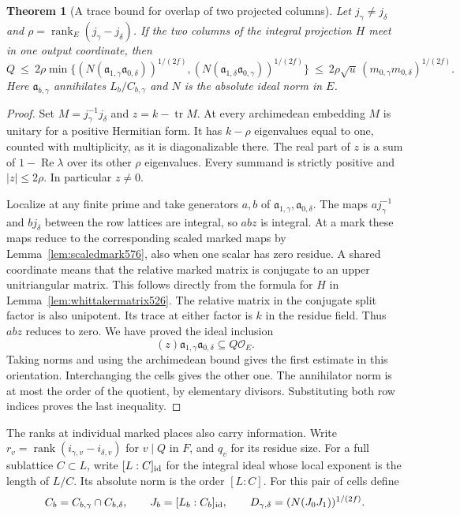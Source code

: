 \documentclass[a4paper,11pt]{article}
\newtheorem{theorem}[proposition]{Theorem}
\theoremstyle{definition}
\theoremstyle{remark}
\numberwithin{equation}{section}
\begin{document}
\begin{theorem}[A trace bound for overlap of two projected columns]
\leavevmode\label{thm:traceoverlap602}
Let \(j_\gamma\ne j_\delta\) and
\(\rho=\operatorname{rank}_E(j_\gamma-j_\delta)\).
If the two columns of the integral projection \(H\) meet in
one output coordinate, then
\[
 Q\ \le\ 2\rho\min\bigl\{
    (N(\mathfrak a_{1,\gamma}\mathfrak a_{0,\delta}))^{1/(2f)},
    (N(\mathfrak a_{1,\delta}\mathfrak a_{0,\gamma}))^{1/(2f)}
                         \bigr\}
 \ \le\ 2\rho\sqrt u\,(m_{0,\gamma}m_{0,\delta})^{1/(2f)} .
\]
Here \(\mathfrak a_{b,\gamma}\) annihilates \(L_b/C_{b,\gamma}\)
and \(N\) is the absolute ideal norm in \(E\).
\end{theorem}
\begin{proof}
Set \(M=j_\gamma^{-1}j_\delta\) and \(z=k-\operatorname{tr} M\).
At every archimedean embedding \(M\) is unitary for a positive
Hermitian form. It has \(k-\rho\) eigenvalues equal to one,
counted with multiplicity, as it is diagonalizable there.
The real part of \(z\) is a sum of \(1-\operatorname{Re}\lambda\)
over its other \(\rho\) eigenvalues. Every summand is strictly
positive and \(|z|\le2\rho\). In particular \(z\ne0\).

Localize at any finite prime and take generators \(a,b\) of
\(\mathfrak a_{1,\gamma},\mathfrak a_{0,\delta}\). The maps
\(a j_\gamma^{-1}\) and \(b j_\delta\) between the row
lattices are integral, so \(abz\) is integral. At a mark these
maps reduce to the corresponding scaled marked maps by
Lemma~\ref{lem:scaledmark576}, also when one scalar has zero
residue. A shared coordinate means that the relative marked
matrix is conjugate to an upper unitriangular matrix. This
follows directly from the formula for \(H\) in
Lemma~\ref{lem:whittakermatrix526}. The relative matrix in
the conjugate split factor is also unipotent. Its trace at
either factor is \(k\) in the residue field. Thus \(abz\)
reduces to zero. We have proved the ideal inclusion
\[
       (z)\mathfrak a_{1,\gamma}\mathfrak a_{0,\delta}
                                      \subseteq Q\mathcal O_E .
\]
Taking norms and using the archimedean bound gives the first
estimate in this orientation. Interchanging the cells gives
the other one. The annihilator norm is at most the order of
the quotient, by elementary divisors. Substituting both row
indices proves the last inequality.
\end{proof}

The ranks at individual marked places also carry information.
Write \(r_v=\operatorname{rank}(i_{\gamma,v}-i_{\delta,v})\)
for \(v\mid Q\) in \(F\), and \(q_v\) for its residue size.
For a full sublattice \(C\subset L\), write \([L:C]_{\rm id}\)
for the integral ideal whose local exponent is the length of
\(L/C\). Its absolute norm is the order \([L:C]\).
For this pair of cells define
\[
 C_b=C_{b,\gamma}\cap C_{b,\delta},\qquad
 J_b=[L_b:C_b]_{\rm id},\qquad
 D_{\gamma,\delta}=(N(J_0J_1))^{1/(2f)}.
\]
\end{document}
